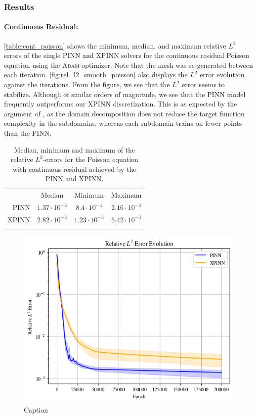 \subsubsection{Results}
\paragraph{Continuous Residual:}
\autoref{table:cont_poisson} shows the minimum, median, and maximum relative $L^2$ errors of the single PINN and XPINN solvers for the continuous residual Poisson equation using the \textsc{Adam} optimizer.
Note that the mesh was re-generated between each iteration.
\autoref{fig:rel_l2_smooth_poisson} also displays the $L^2$ error evolution against the iterations.
From the figure, we see that the $L^2$ error seems to stabilize.
Although of similar orders of magnitude, we see that the PINN model frequently outperforms our XPINN discretization.
This is as expected by the argument of \textcite{XPINN_generalize}, as the domain decomposition does not reduce the target function complexity in the subdomains, whereas each subdomain trains on fewer points than the PINN. 

\begin{table}[h]
\caption{Median, minimum and maximum of the relative $L^2$-errors for the Poisson equation with continuous residual achieved by the PINN and XPINN.}
    \centering
    \begin{tabular}{r|c|c|c}\toprule
     & Median & Minimum & Maximum
    \\
    \colrule
    PINN & $1.37\cdot 10^{-3}$ &  $8.4 \cdot 10^{-4}$ & $2.16 \cdot 10^{-3}$ 
    \\
    XPINN & $2.82\cdot 10^{-3} $ &  $1.23 \cdot 10^{-3}$ & $5.42 \cdot 10^{-3}$
    \\
    \botrule
    \end{tabular}
    \label{table:cont_poisson}
\end{table}
\begin{figure}[h!]
    \centering
    \includegraphics[width = \linewidth]{Project1XPINNs/figures/Poisson/Relative_L2_smooth_Adam.png}
    \caption{Caption}
    \label{fig:rel_l2_smooth_poisson}
\end{figure}

